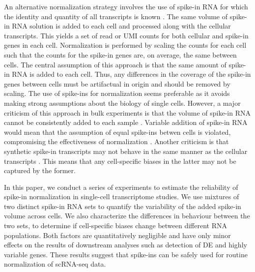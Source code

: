 \documentclass{article}
\begin{document}
An alternative normalization strategy involves the use of spike-in RNA for which the identity and quantity of all transcripts is known \cite{stegle2015computational}.
The same volume of spike-in RNA solution is added to each cell and processed along with the cellular transcripts.
This yields a set of read or UMI counts for both cellular and spike-in genes in each cell.
Normalization is performed by scaling the counts for each cell such that the counts for the spike-in genes are, on average, the same between cells.
The central assumption of this approach is that the same amount of spike-in RNA is added to each cell.
Thus, any differences in the coverage of the spike-in genes between cells must be artifactual in origin and should be removed by scaling.
The use of spike-ins for normalization seems preferable as it avoids making strong assumptions about the biology of single cells.
However, a major criticism of this approach in bulk experiments is that the volume of spike-in RNA cannot be consistently added to each sample \cite{robinson2010tmm}.
Variable addition of spike-in RNA would mean that the assumption of equal spike-ins betwen cells is violated, compromising the effectiveness of normalization \cite{risso2014normalization}.
Another criticism is that synthetic spike-in transcripts may not behave in the same manner as the cellular transcripts \cite{grun2015design}.
This means that any cell-specific biases in the latter may not be captured by the former.

In this paper, we conduct a series of experiments to estimate the reliability of spike-in normalization in single-cell transcriptome studies.
We use mixtures of two distinct spike-in RNA sets to quantify the variability of the added spike-in volume across cells.
We also characterize the differences in behaviour between the two sets, to determine if cell-specific biases change between different RNA populations.
Both factors are quantitatively negligible and have only minor effects on the results of downstream analyses such as detection of DE and highly variable genes.
These results suggest that spike-ins can be safely used for routine normalization of scRNA-seq data.
\end{document}
